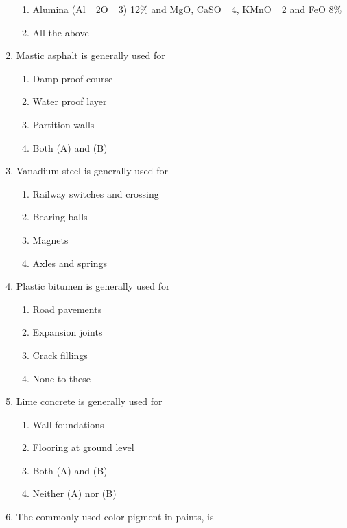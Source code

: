 \documentclass[11pt,a4paper]{article}
\begin{document}
\begin{enumerate}
\begin{enumerate}[label=\Alph*.]
\item{Alumina (Al\_ 2O\_ 3) 12\% and MgO, CaSO\_ 4, KMnO\_ 2 and FeO 8\%}
\item{All the above}
\end{enumerate}
\item{Mastic asphalt is generally used for}
\begin{enumerate}[label=\Alph*.]
\item{Damp proof course}
\item{Water proof layer}
\item{Partition walls}
\item{Both (A) and (B)}
\end{enumerate}
\item{Vanadium steel is generally used for}
\begin{enumerate}[label=\Alph*.]
\item{Railway switches and crossing}
\item{Bearing balls}
\item{Magnets}
\item{Axles and springs}
\end{enumerate}
\item{Plastic bitumen is generally used for}
\begin{enumerate}[label=\Alph*.]
\item{Road pavements}
\item{Expansion joints}
\item{Crack fillings}
\item{None to these}
\end{enumerate}
\item{Lime concrete is generally used for}
\begin{enumerate}[label=\Alph*.]
\item{Wall foundations}
\item{Flooring at ground level}
\item{Both (A) and (B)}
\item{Neither (A) nor (B)}
\end{enumerate}
\item{The commonly used color pigment in paints, is}
\\

\end{enumerate}
\end{document}
